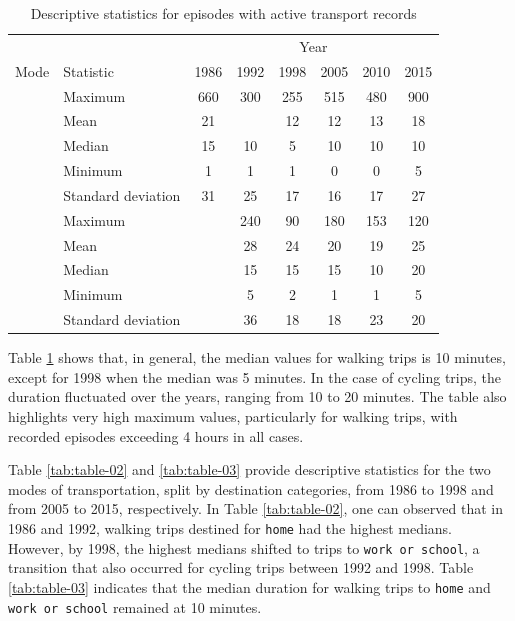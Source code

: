 \documentclass[Royal,times,sageh]{sagej}
\begin{document}
\begin{longtable}[t]{>{}llcccccc}
\caption{\label{tab:table-01}\label{tab:table-01}Descriptive statistics for episodes with active transport records}\\
\toprule
\multicolumn{2}{c}{ } & \multicolumn{6}{c}{Year} \\
\cmidrule(l{3pt}r{3pt}){3-8}
Mode & Statistic & 1986 & 1992 & 1998 & 2005 & 2010 & 2015\\
\midrule
 & Maximum & 660 & 300 & 255 & 515 & 480 & 900\\
\nopagebreak
 & Mean & 21 &  & 12 & 12 & 13 & 18\\
\nopagebreak
 & Median & 15 & 10 & 5 & 10 & 10 & 10\\
\nopagebreak
 & Minimum & 1 & 1 & 1 & 0 & 0 & 5\\
\nopagebreak
\multirow[t]{-5}{*}{\raggedright\arraybackslash \textbf{Walking}} & Standard deviation & 31 & 25 & 17 & 16 & 17 & 27\\
\cmidrule{1-8}\pagebreak[0]
 & Maximum &  & 240 & 90 & 180 & 153 & 120\\
\nopagebreak
 & Mean &  & 28 & 24 & 20 & 19 & 25\\
\nopagebreak
 & Median &  & 15 & 15 & 15 & 10 & 20\\
\nopagebreak
 & Minimum &  & 5 & 2 & 1 & 1 & 5\\
\nopagebreak
\multirow[t]{-5}{*}{\raggedright\arraybackslash \textbf{Cycling}} & Standard deviation &  & 36 & 18 & 18 & 23 & 20\\
\bottomrule
\end{longtable}
\endgroup{}

Table \ref{tab:table-01} shows that, in general, the median values for
walking trips is 10 minutes, except for 1998 when the median was 5
minutes. In the case of cycling trips, the duration fluctuated over the
years, ranging from 10 to 20 minutes. The table also highlights very
high maximum values, particularly for walking trips, with recorded
episodes exceeding 4 hours in all cases.

Table \ref{tab:table-02} and \ref{tab:table-03} provide descriptive
statistics for the two modes of transportation, split by destination
categories, from 1986 to 1998 and from 2005 to 2015, respectively. In
Table \ref{tab:table-02}, one can observed that in 1986 and 1992,
walking trips destined for \texttt{home} had the highest medians.
However, by 1998, the highest medians shifted to trips to
\texttt{work\ or\ school}, a transition that also occurred for cycling
trips between 1992 and 1998. Table \ref{tab:table-03} indicates that the
median duration for walking trips to \texttt{home} and
\texttt{work\ or\ school} remained at 10 minutes.
\end{document}
